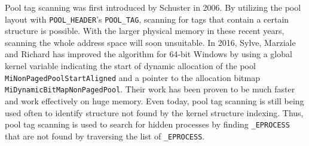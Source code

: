 Pool tag scanning was first introduced by Schuster \cite{pooltagscan} in 2006. By utilizing the pool layout with \texttt{POOL\_HEADER}'s \texttt{POOL\_TAG}, scanning for tags that contain a certain structure is possible. With the larger physical memory in these recent years, scanning the whole address space will soon unsuitable. In 2016, Sylve, Marziale and Richard \cite{sylve2016pool} has improved the algorithm for 64-bit Windows by using a global kernel variable indicating the start of dynamic allocation of the pool \texttt{MiNonPagedPoolStartAligned} and a pointer to the allocation bitmap \texttt{MiDynamicBitMapNonPagedPool}. Their work has been proven to be much faster and work effectively on huge memory. Even today, pool tag scanning is still being used often to identify structure not found by the kernel structure indexing. Thus, pool tag scanning is used to search for hidden processes by finding \texttt{\_EPROCESS} that are not found by traversing the list of \texttt{\_EPROCESS}.
